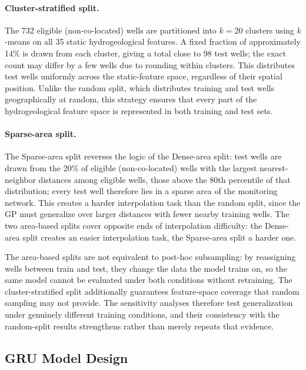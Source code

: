 \paragraph{Cluster-stratified split.}
The 732 eligible (non-co-located) wells are partitioned into $k = 20$ clusters using $k$-means on all 35 static hydrogeological features. A fixed fraction of approximately 14\% is drawn from each cluster, giving a total close to 98 test wells; the exact count may differ by a few wells due to rounding within clusters. This distributes test wells uniformly across the static-feature space, regardless of their spatial position. Unlike the random split, which distributes training and test wells geographically at random, this strategy ensures that every part of the hydrogeological feature space is represented in both training and test sets.

\paragraph{Sparse-area split.}
The Sparse-area split reverses the logic of the Dense-area split: test wells are drawn from the 20\% of eligible (non-co-located) wells with the largest nearest-neighbor distances among eligible wells, those above the 80th percentile of that distribution; every test well therefore lies in a sparse area of the monitoring network. This creates a harder interpolation task than the random split, since the GP must generalize over larger distances with fewer nearby training wells. The two area-based splits cover opposite ends of interpolation difficulty: the Dense-area split creates an easier interpolation task, the Sparse-area split a harder one.

The area-based splits are not equivalent to post-hoc subsampling: by reassigning wells between train and test, they change the data the model trains on, so the same model cannot be evaluated under both conditions without retraining. The cluster-stratified split additionally guarantees feature-space coverage that random sampling may not provide. The sensitivity analyses therefore test generalization under genuinely different training conditions, and their consistency with the random-split results strengthens rather than merely repeats that evidence.

\subsection{GRU Model Design}
\label{sec:gru_design}

